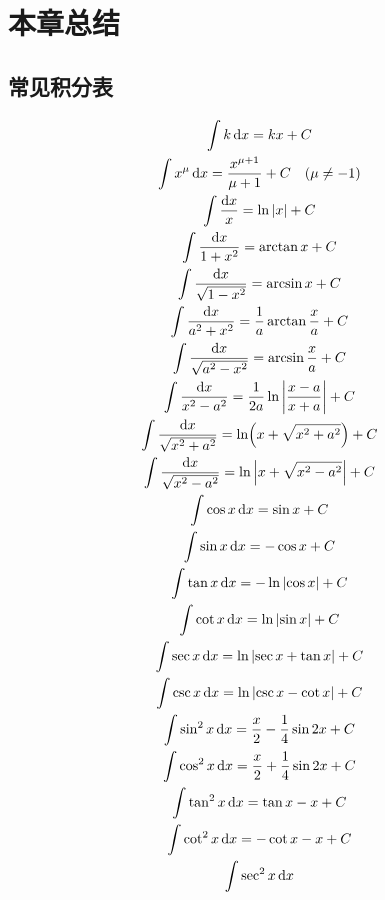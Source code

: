 \section{本章总结}
\subsection{常见积分表}
\begin{gather*}
	\int k \dd{x}
	= kx + C \\
	\int x^\mu \dd{x}
	= \frac{x^{\mu + 1}}{\mu + 1} + C \quad (\mu \neq -1) \\
	\int \frac{\dd{x}}{x}
	= \ln\abs{x} + C \\
	\int \frac{\dd{x}}{1 + x^2}
	= \arctan x + C \\
	\int \frac{\dd{x}}{\sqrt{1 - x^2}}
	= \arcsin x + C \\
	\int \frac{\dd{x}}{a^2 + x^2}
	= \frac{1}{a} \arctan\frac{x}{a} + C \\
	\int \frac{\dd{x}}{\sqrt{a^2 - x^2}}
	= \arcsin\frac{x}{a} + C \\
	\int \frac{\dd{x}}{x^2 - a^2}
	= \frac{1}{2a} \ln\abs{\frac{x - a}{x + a}} + C \\
	\int \frac{\dd{x}}{\sqrt{x^2 + a^2}}
	= \ln(x + \sqrt{x^2 + a^2}) + C \\
	\int \frac{\dd{x}}{\sqrt{x^2 - a^2}}
	= \ln\abs{x + \sqrt{x^2 - a^2}} + C \\
	\int \cos x \dd{x}
	= \sin x + C \\
	\int \sin x \dd{x}
	= -\cos x + C \\
	\int \tan x \dd{x}
	= -\ln\abs{\cos x} + C \\
	\int \cot x \dd{x}
	= \ln\abs{\sin x} + C \\
	\int \sec x \dd{x}
	= \ln\abs{\sec x + \tan x} + C \\
	\int \csc x \dd{x}
	= \ln\abs{\csc x - \cot x} + C \\
	\int \sin^2 x \dd{x}
	= \frac{x}2 - \frac14 \sin 2x + C \\
	\int \cos^2 x \dd{x}
	= \frac{x}2 + \frac14 \sin 2x + C \\
	\int \tan^2 x \dd{x}
	= \tan x - x + C \\
	\int \cot^2 x \dd{x}
	= -\cot x - x + C \\
	\int \sec^2 x \dd{x}

\end{gather*}
